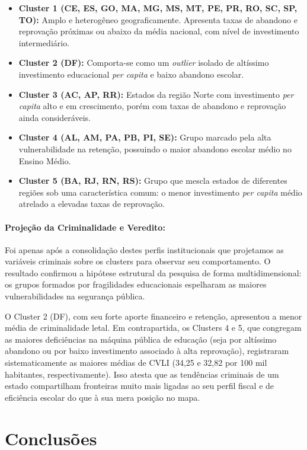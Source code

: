 \documentclass[10pt]{article}
\begin{document}
\begin{itemize}
    \item \textbf{Cluster 1 (CE, ES, GO, MA, MG, MS, MT, PE, PR, RO, SC, SP, TO):} Amplo e heterogêneo geograficamente. Apresenta taxas de abandono e reprovação próximas ou abaixo da média nacional, com nível de investimento intermediário.
    \item \textbf{Cluster 2 (DF):} Comporta-se como um \textit{outlier} isolado de altíssimo investimento educacional \textit{per capita} e baixo abandono escolar.
    \item \textbf{Cluster 3 (AC, AP, RR):} Estados da região Norte com investimento \textit{per capita} alto e em crescimento, porém com taxas de abandono e reprovação ainda consideráveis.
    \item \textbf{Cluster 4 (AL, AM, PA, PB, PI, SE):} Grupo marcado pela alta vulnerabilidade na retenção, possuindo o maior abandono escolar médio no Ensino Médio.
    \item \textbf{Cluster 5 (BA, RJ, RN, RS):} Grupo que mescla estados de diferentes regiões sob uma característica comum: o menor investimento \textit{per capita} médio atrelado a elevadas taxas de reprovação.
\end{itemize}

\paragraph{Projeção da Criminalidade e Veredito:}Foi apenas após a consolidação destes perfis institucionais que projetamos as variáveis criminais sobre os clusters para observar seu comportamento. O resultado confirmou a hipótese estrutural da pesquisa de forma multidimensional: os grupos formados por fragilidades educacionais espelharam as maiores vulnerabilidades na segurança pública.

O Cluster 2 (DF), com seu forte aporte financeiro e retenção, apresentou a menor média de criminalidade letal. Em contrapartida, os Clusters 4 e 5, que congregam as maiores deficiências na máquina pública de educação (seja por altíssimo abandono ou por baixo investimento associado à alta reprovação), registraram sistematicamente as maiores médias de CVLI (34,25 e 32,82 por 100 mil habitantes, respectivamente). Isso atesta que as tendências criminais de um estado compartilham fronteiras muito mais ligadas ao seu perfil fiscal e de eficiência escolar do que à sua mera posição no mapa.

\section{Conclusões}
\end{document}
